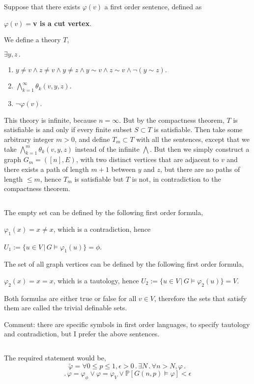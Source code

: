 \documentclass{article}
\begin{document}
Suppose that there exists $\varphi(v)$ a first order sentence, defined as

$\varphi(v)=$\textbf{v is a cut vertex}.

We define a theory $T$,

$\exists{y,z}\,.$
\begin{enumerate}
    \item $y\neq{v}\land{z}\neq{v}\land{y}\neq{z}\land{y\sim{v}}\land{z\sim{v}}\land\neg(y\sim{z})$.
    \item 
    $\bigwedge_{k=1}^\infty\theta_k(v,y,z)$.
    \item 
    $\neg\varphi(v)$.
\end{enumerate}

This theory is infinite, because $n=\infty$. But by the compactness theorem, $T$ is satisfiable is and only if every finite subset $S\subset{T}$ is satisfiable.
Then take some arbitrary integer $m>0$, and define $T_m\subset{T}$ with all the sentences, except that we take $\bigwedge_{k=1}^m\theta_k(v,y,z)$ instead of the infinite $\bigwedge$.
But then we simply construct a graph $G_m=([n],E)$, with two distinct vertices that are adjacent to $v$ and there exists a path of length $m+1$ between $y$ and $z$, but there are no paths of length $\leq{m}$, hence $T_m$ is satisfiable but $T$ is not, in contradiction to the compactness theorem.
\subsection{}
The empty set can be defined by the following first order formula,

$\varphi_1(x)=x\neq{x}$, which is a contradiction, hence 

$U_1:=\{u\in{V}\,|\,{G\vDash\varphi_1(u)}\}=\phi$.

The set of all graph vertices can be defined by the following first order formula,

$\varphi_2(x)=x=x$, which is a tautology, hence $U_2:=\{u\in{V}\,|\,{G\vDash\varphi_2(u)}\}=V$.

Both formulas are either true or false for all $v\in{V}$, therefore the sets that satisfy them are called the trivial definable sets.

Comment: there are specific symbols in first order languages, to specify tautology and contradiction, but I prefer the above sentences.
\subsection{}
The required statement would be,
\noindent
\[\tilde\varphi=\forall{0\leq{p}\leq{1}},\epsilon>0\,.\,\exists{N}\,.\,\forall{n>N},\varphi\,.\,\]\[.\,\varphi=\varphi_\phi\lor\varphi=\varphi_V\lor\mathbb{P}[G(n,p)\vDash\varphi]<\epsilon\]
\end{document}
